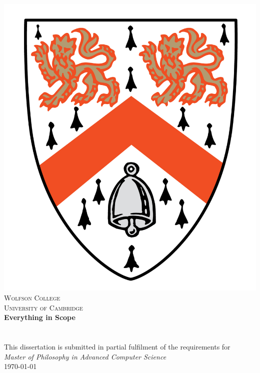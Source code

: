 

\pagestyle{empty}



\vspace*{30mm}
\begin{center}
	\vspace{-2mm}
	\includegraphics[scale=0.7]{./crest.png}
	\hspace{0mm}
	\vspace{2mm}\\
        \LARGE\textsc{Wolfson College}\\[2mm]
        \normalsize\textsc{University of Cambridge}
        \vspace{20mm}\\
        
	\huge
	\textbf{\sffamily Everything in Scope} \\[4mm]
  \Large
  \\[1mm] \\[37mm]

        \normalsize
	This dissertation is submitted in partial fulfilment of the requirements for \\[1mm]
        \emph{Master of Philosophy in Advanced Computer Science}
	 \\[10mm]

	\normalsize
	\today
\end{center}

\newpage
\thispagestyle{empty}

